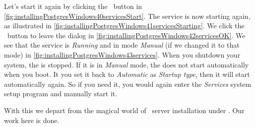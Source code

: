 Let's start it again by clicking the ~button in \cref{fig:installingPostgresWindows40servicesStart}.
The service is now starting again, as illustrated in \cref{fig:installingPostgresWindows41servicesStarting}.
We click the ~button to leave the dialog in \cref{fig:installingPostgresWindows42servicesOK}.
We see that the service is \emph{Running} and in mode \emph{Manual} (if we changed it to that mode) in \cref{fig:installingPostgresWindows43services}.
When you shutdown your system, the  is stopped.
If it is in \emph{Manual} mode, the  does not start automatically when you boot.
It you set it back to \emph{Automatic} as \emph{Startup type}, then it will start automatically again.
So if you need it, you would again enter the \emph{Services} system setup program and manually start it.

With this we depart from the magical world of \postgresql\ server installation under \windows.
Our work here is done.%
\FloatBarrier%
\endhsection%
%

